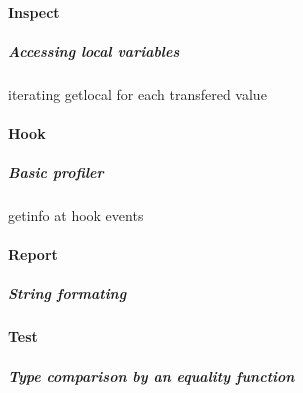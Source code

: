 \paragraph*{Inspect}
\subparagraph*{Accessing local variables}
iterating getlocal for each transfered value
\paragraph*{Hook}
\subparagraph*{Basic profiler}
getinfo at hook events
\paragraph*{Report}
\subparagraph*{String formating}
\paragraph*{Test}
\subparagraph*{Type comparison by an equality function}




